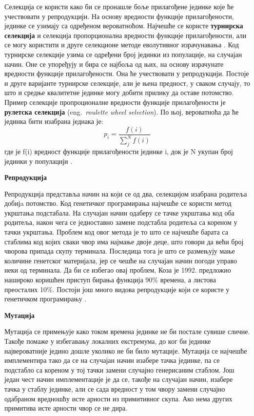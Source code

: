 \documentclass[a4paper]{article}
\begin{document}
Селекција се користи како би се пронашле боље прилагођене јединке које ће учествовати у репродукцији. На основу вредности функције прилагођености, јединке се узимају са одређеном вероватноћом. Најчешће се користе \textbf{турнирска селекција} и селекција пропорционална вредности функције прилагођености, али се могу користити и друге селекционе методе еволутивног израчунавања \cite{compIntelligence}. Код турнирске селекције узима се одређени број јединки из популације, на случајан начин. Оне се упоређују и бира се најбоља од њих, на основу израчунате вредности функције прилагођености. Она ће учествовати у репродукцији. Постоје и друге варијанте турнирске селекције, али је њена предност, у сваком случају, то што и средње квалитетне јединке могу добити прилику да оставе потомство. Пример селекције пропроционалне вредности функције прилагођености је \textbf{рулетска селекција} (eng.~{\em roulette wheel selection}). По њој, вероватноћа да ће јединка бити изабрана једнака је: 
\begin{equation} 
    p_i = \frac{f(i)}{\sum_{j}^{N} f(i)}
\end{equation}
где је f(i) вредност функције прилагођености јединке i, док је N укупан број јединки у популацији \cite{vi}.\newline


\noindent
\textbf{\large Репродукција}\newline
\label{text:reprodukcija}

Репродукција представља начин на који се од два, селекцијом изабрана родитеља добијa потомство. Код генетичког програмирања најчешће се користи метод укрштања подстабала. На случајан начин одаберу се тачке укрштања код оба родитеља, након чега се једноставно замене подстабла родитеља са кореном у тачки укрштања. Проблем код овог метода је то што се најчешће барата са стаблима код којих сваки чвор има најмање двоје деце, што говори да већи број чворова припада скупу терминала. Последица тога је што се размењују мање количине генетског материјала, јер се чешће на случајан начин погоди управо неки од терминала. Да би се избегао овај проблем, Коза је 1992. предложио нашироко коришћен приступ бирања функција 90\% времена, а листова преосталих 10\%. Постоји још много видова репродукције који се користе у генетичком програмирању \cite{fieldGuidetoGP}.\newline

\medskip
\noindent
\textbf{\large Мутација}\newline

Мутација се примењује како током времена јединке не би постале сувише сличне. Такође помаже у избегавању локалних екстремума, до ког би јединке највероватније једино дошле уколико не би било мутације.
Мутација се најчешће имплементира тако да се на случајан начин изабере тачка јединке, па се подстабло са кореном у тој тачки замени случајно генерисаним стаблом. Још један чест начин имплементације је да се, такође на случајан начин, изабере тачка у стаблу јединке, али се сада вредност у том чвору замени случајно одабраном вредношћу исте арности из примитивног скупа. Ако нема других примитива исте арности чвор се не дира. 
\end{document}
